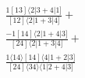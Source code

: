 \documentclass[varwidth, border=5pt]{standalone}
\begin{document}
\begin{my}
$\begin{gathered}
\scriptscriptstyle\frac{1[13]⟨2|3+4|1]}{[12]⟨2|1+3|4]} +\\
\scriptscriptstyle\frac{-1[14]⟨2|1+4|3]}{[24]⟨2|1+3|4]} +\\
\scriptscriptstyle\frac{1⟨14⟩[14]⟨4|1+2|3]}{[24]⟨34⟩⟨1|2+4|3]} \phantom{+}
\end{gathered}$
\end{my}
\end{document}
